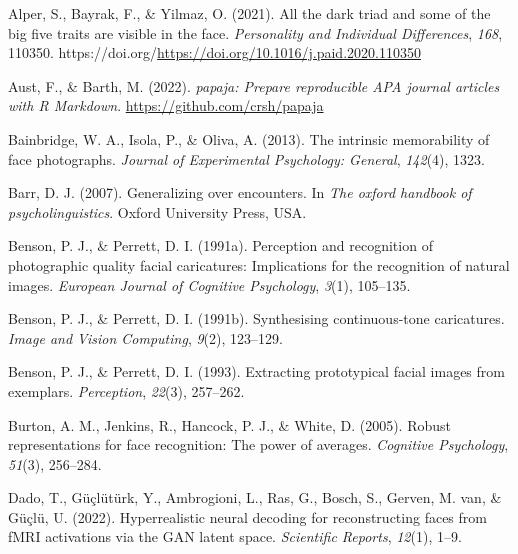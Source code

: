 \documentclass[
  man,floatsintext]{apa6}
\newlength{\cslhangindent}
\newlength{\cslentryspacingunit} %
\newenvironment{CSLReferences}[2] %
 {%
  \setlength{\parindent}{0pt}
  \ifodd #1
  \let\oldpar\par
  \def\par{\hangindent=\cslhangindent\oldpar}
  \fi
  \setlength{\parskip}{#2\cslentryspacingunit}
 }%
 {}
\begin{document}
\hypertarget{refs}{}
\begin{CSLReferences}{1}{0}
\leavevmode{}%
Alper, S., Bayrak, F., \& Yilmaz, O. (2021). All the dark triad and some of the big five traits are visible in the face. \emph{Personality and Individual Differences}, \emph{168}, 110350. https://doi.org/\url{https://doi.org/10.1016/j.paid.2020.110350}

\leavevmode{}%
Aust, F., \& Barth, M. (2022). \emph{{papaja}: {Prepare} reproducible {APA} journal articles with {R Markdown}}. \url{https://github.com/crsh/papaja}

\leavevmode{}%
Bainbridge, W. A., Isola, P., \& Oliva, A. (2013). The intrinsic memorability of face photographs. \emph{Journal of Experimental Psychology: General}, \emph{142}(4), 1323.

\leavevmode{}%
Barr, D. J. (2007). Generalizing over encounters. In \emph{The oxford handbook of psycholinguistics}. Oxford University Press, USA.

\leavevmode{}%
Benson, P. J., \& Perrett, D. I. (1991a). Perception and recognition of photographic quality facial caricatures: Implications for the recognition of natural images. \emph{European Journal of Cognitive Psychology}, \emph{3}(1), 105--135.

\leavevmode{}%
Benson, P. J., \& Perrett, D. I. (1991b). Synthesising continuous-tone caricatures. \emph{Image and Vision Computing}, \emph{9}(2), 123--129.

\leavevmode{}%
Benson, P. J., \& Perrett, D. I. (1993). Extracting prototypical facial images from exemplars. \emph{Perception}, \emph{22}(3), 257--262.

\leavevmode{}%
Burton, A. M., Jenkins, R., Hancock, P. J., \& White, D. (2005). Robust representations for face recognition: The power of averages. \emph{Cognitive Psychology}, \emph{51}(3), 256--284.

\leavevmode{}%
Dado, T., Güçlütürk, Y., Ambrogioni, L., Ras, G., Bosch, S., Gerven, M. van, \& Güçlü, U. (2022). Hyperrealistic neural decoding for reconstructing faces from fMRI activations via the GAN latent space. \emph{Scientific Reports}, \emph{12}(1), 1--9.


\end{CSLReferences}
\end{document}
